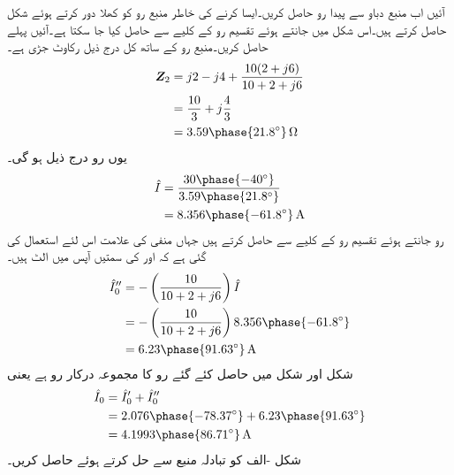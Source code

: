 آئیں اب منبع دباو سے پیدا رو حاصل کریں۔ایسا کرنے کی خاطر منبع رو کو کھلا دور کرتے ہوئے شکل  حاصل کرتے ہیں۔اس شکل میں  جانتے ہوئے تقسیم رو کے کلیے سے  حاصل کیا جا سکتا ہے۔آئیں پہلے  حاصل کریں۔منبع رو کے ساتھ کل درج ذیل رکاوٹ جڑی ہے۔
\begin{align*}
\bZ_2&=j2-j4+\frac{10(2+j6)}{10+2+j6}\\
&=\frac{10}{3}+j\frac{4}{3}\\
&=3.59\phase{21.8^{\circ}}\,\si{\ohm}
\end{align*}
یوں رو  درج ذیل ہو گی۔
\begin{align*}
\hat{I}&=\frac{30\phase{-40^{\circ}}}{3.59\phase{21.8^{\circ}}}\\
&=8.356\phase{-61.8^{\circ}}\,\si{\ampere}
\end{align*}
رو  جانتے ہوئے تقسیم رو کے کلیے سے  حاصل کرتے ہیں جہاں منفی کی علامت اس لئے استعمال کی گئی ہے کہ   اور  کی سمتیں آپس میں الٹ ہیں۔
\begin{align*}
\hat{I}''_0&=-\left(\frac{10}{10+2+j6}\right) \hat{I}\\
&=-\left(\frac{10}{10+2+j6}\right) 8.356\phase{-61.8^{\circ}}\\
&=6.23\phase{91.63^{\circ}}\,\si{\ampere}
\end{align*}
شکل  اور شکل  میں حاصل کئے گئے رو کا مجموعہ درکار رو ہے یعنی
\begin{align*}
\hat{I}_0&=\hat{I}'_0+\hat{I}''_0\\
&=2.076\phase{-78.37^{\circ}}+6.23\phase{91.63^{\circ}}\\
&=4.1993\phase{86.71^{\circ}}\,\si{\ampere}
\end{align*}
شکل -الف کو تبادلہ منبع سے حل کرتے ہوئے  حاصل کریں۔

